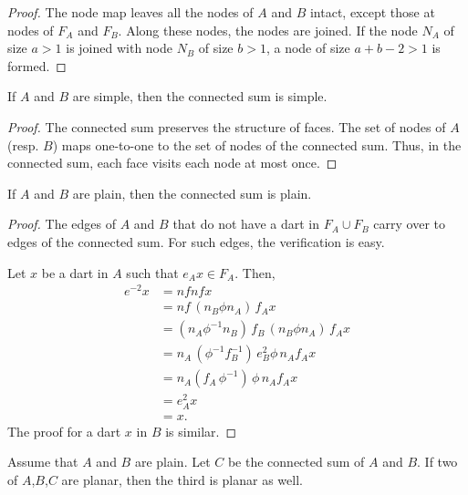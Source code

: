 \begin{proof}  The node map leaves all the nodes of $A$ and $B$
intact, except those at nodes of $F_A$ and $F_B$.  Along these
nodes, the nodes are joined.  If the node $N_A$ of size $a>1$ is
joined with node $N_B$ of size $b>1$, a node of size $a+b-2>1$ is
formed.
\end{proof}

\begin{lemma} 
If $A$ and $B$ are simple, then
the connected sum is simple.
\end{lemma}

\begin{proof} The connected sum preserves the structure of faces.
The set of nodes of $A$ (resp. $B$) maps one-to-one to the 
set of nodes of the
connected sum.  Thus, in the connected sum, each face visits each
node at most once.
\end{proof}

\begin{lemma}
If $A$ and $B$ are plain, then
the connected sum is plain.
\end{lemma}

\begin{proof} The edges of $A$ and $B$ that do not have a dart
in $F_A\cup F_B$ carry over to edges of the connected sum.  For
such edges, the verification is easy.

Let $x$ be a dart in $A$ such that $e_A x \in F_A$.  Then,
     $$
     \begin{array}{lll}
     e^{-2} x &= n f n f x \\ &= n f\, (n_B \phi n_A)\, f_A x\\
               &= (n_A \phi^{-1} n_B)\, f_B\, (n_B \phi n_A)\, f_A x\\
               &= n_A\, (\phi^{-1} f_B^{-1})\, e_B^2 \phi\, n_A f_A x\\
               &= n_A (f_A\, \phi^{-1})\,\phi\, n_A f_A x\\
               &= e_A^2 x\\
               &= x.
     \end{array}
     $$
The proof for a dart $x$ in $B$ is similar.
\end{proof}

\begin{lemma}
Assume that $A$ and $B$ are plain.
Let $C$ be the connected sum of $A$ and $B$.
If two of $A$,$B$,$C$ are planar, then
    the third is planar as well.
\end{lemma}

